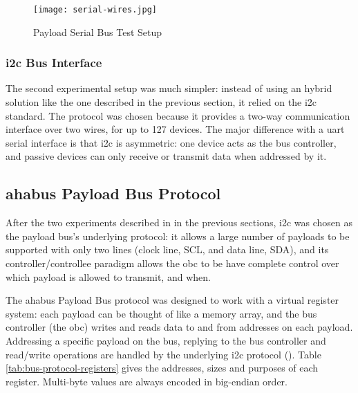 \begin{figure}[H]
\texttt{[image: serial-wires.jpg]}
\centering
\caption{Payload Serial Bus Test Setup}
\label{fig:uart-nor}
\end{figure}

\subsubsection{\acrshort{i2c} Bus Interface}


The second experimental setup was much simpler: instead of using an hybrid
solution like the one described in the previous section, it relied on the
\acrshort{i2c} standard. The protocol was chosen because it provides a two-way
communication interface over two wires, for up to 127 devices. The major
difference with a \acrshort{uart} serial interface is that \acrshort{i2c} is
asymmetric: one device acts as the bus controller, and passive devices can
only receive or transmit data when addressed by it.

\subsection{\acrshort{ahabus} Payload Bus Protocol}

After the two experiments described in in the previous sections, \acrshort{i2c}
was chosen as the payload bus's underlying protocol: it allows a large number of
payloads to be supported with only two lines (clock line, SCL, and data line,
SDA), and its controller/controllee paradigm allows the \acrshort{obc} to be
have complete control over which payload is allowed to transmit, and when.

The \acrshort{ahabus} Payload Bus protocol was designed to work with a virtual register
system: each payload can be thought of like a memory array, and the bus
controller (the \acrshort{obc}) writes and reads data to and from addresses on
each payload. Addressing a specific payload on the bus, replying to the bus
controller and read/write operations are handled by the underlying
\acrshort{i2c} protocol (\cite{NXPSemiconductors2014}). Table
\ref{tab:bus-protocol-registers} gives the addresses, sizes and purposes of
each register. Multi-byte values are always encoded in big-endian order.

